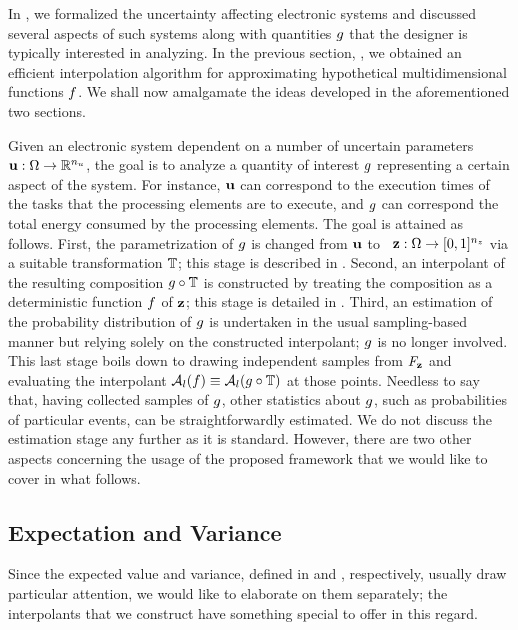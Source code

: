 In , we formalized the uncertainty affecting electronic systems
and discussed several aspects of such systems along with quantities $g$ that
the designer is typically interested in analyzing. In the previous section,
, we obtained an efficient interpolation algorithm for
approximating hypothetical multidimensional functions $f$. We shall now
amalgamate the ideas developed in the aforementioned two sections.

Given an electronic system dependent on a number of uncertain parameters $\mathbf{u}:
\Omega \to \mathbb{R}^{n_u}$, the goal is to analyze a quantity of interest $g$
representing a certain aspect of the system. For instance, $\mathbf{u}$ can correspond
to the execution times of the tasks that the processing elements are to execute,
and $g$ can correspond the total energy consumed by the processing elements.
The goal is attained as follows. First, the parametrization of $g$ is changed
from $\mathbf{u}$ to \rvs\ $\mathbf{z}: \Omega \to [0, 1]^{n_z}$ via a suitable
transformation $\mathbb{T}$; this stage is described in .
Second, an interpolant of the resulting composition $g \circ \mathbb{T}$
is constructed by treating the composition as a deterministic function $f$ of
$\mathbf{z}$; this stage is detailed in . Third, an estimation of
the probability distribution of $g$ is undertaken in the usual sampling-based
manner but relying solely on the constructed interpolant; $g$ is no longer
involved. This last stage boils down to drawing independent samples from
$F_{\mathbf{z}}$ and evaluating the interpolant $\mathcal{A}_{l}(f)
\equiv \mathcal{A}_{l}(g \circ \mathbb{T})$ at those points. Needless
to say that, having collected samples of $g$, other statistics about $g$, such
as probabilities of particular events, can be straightforwardly estimated. We do
not discuss the estimation stage any further as it is standard. However, there
are two other aspects concerning the usage of the proposed framework that we
would like to cover in what follows.

\subsection{Expectation and Variance} 
Since the expected value and variance, defined in  and
, respectively, usually draw particular attention, we would like
to elaborate on them separately; the interpolants that we construct have
something special to offer in this regard.

